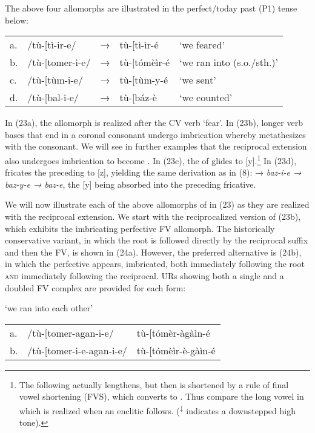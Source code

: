\documentclass[output=paper,
modfonts
]{LSP/langsci}
\begin{document}
\noindent The above four allomorphs are illustrated in the perfect/today past (P1)
tense below:

\ea\begin{tabular}[t]{@{}lllll}
a. & /tù-{[}tì-ir-e/ & → & tù-{[}tì-ìr-é & `we feared'\\
b. & /tù-{[}tomer-i-e/ & → & tù-{[}tómèìr-é & `we ran into (s.o./sth.)' \\
c. & /tù-{[}tùm-i-e/ & → & tù-{[}tùm-y-é & `we sent' \\
d. & /tù-{[}bal-i-e/ & → & tù-{[}báz-è & `we counted'
\end{tabular}
\z

\noindent In (23a), the  allomorph is realized after the CV verb 
`fear'. In (23b), longer verb bases that end in a coronal consonant
undergo imbrication whereby  metathesizes with the consonant.
We will see in further examples that the reciprocal 
extension also undergoes imbrication to become . In
(23c), the  of  glides to {[}y{]}.\footnote{The following
   actually lengthens, but then is shortened by a rule of final
  vowel shortening (FVS), which converts  to
  . Thus compare the long vowel in
  \form{à-{[}lím-y-\textsuperscript{↓}éé =kù} which is realized when an
  enclitic follows. (\textsuperscript{↓} indicates a downstepped high
  tone).} In (23d),  fricates the preceding  to {[}z{]},
yielding the same derivation as in (8):  → \emph{baz-i-e →
baz-y-e → baz-e}, the {[}y{]} being absorbed into the preceding
fricative.

We will now illustrate each of the above allomorphs of  in
(23) as they are realized with the reciprocal extension. We start with
the reciprocalized version of (23b), which exhibits the imbricating
 perfective FV allomorph. The historically conservative
variant, in which the root is followed directly by the reciprocal suffix
and then the  FV, is shown in (24a). However, the preferred
alternative is (24b), in which the perfective  appears,
imbricated, both immediately following the root \textsc{and} immediately
following the reciprocal. URs showing both a single and a doubled FV
complex are provided for each form:

\ea `we ran into each other'\\
\begin{tabular}[t]{@{}lll}
a. & /tù-{[}tomer-agan-i-e/ & tù-{[}tómèr-àgàìn-é \\
b. & /tù-{[}tomer-i-e-agan-i-e/ & tù-{[}tómèìr-è-gàìn-é \\
\end{tabular}
\z
\end{document}
